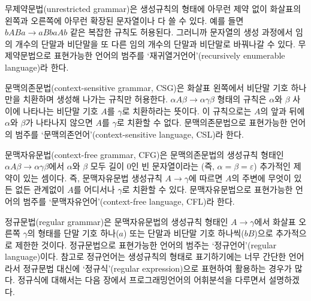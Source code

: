 %
%
%
%
%
%
%
%
무제약문법(unrestricted grammar)은 생성규칙의 형태에 아무런 제약 없이
화살표의 왼쪽과 오른쪽에 아무런 확장된 문자열이나 다 쓸 수 있다. 예를 들면
$bABa \to aBbaAb$ 같은 복잡한 규칙도 허용된다. 그러니까 문자열의 생성 과정에서
임의 개수의 단말과 비단말을 또 다른 임의 개수의 단말과 비단말로 바꿔나갈 수 있다.
무제약문법으로 표현가능한 언어의 범주를
`재귀열거언어'(recursively enumerable language)라 한다.

%
%
%
%
문맥의존문법(context-sensitive grammar, CSG)은 화살표 왼쪽에서 비단말 기호 하나만을
치환하며 생성해 나가는 규칙만 허용한다. $\alpha A\beta\to\alpha\gamma\beta$ 형태의
규칙은 $\alpha$와 $\beta$ 사이에 나타나는 비단말 기호 $A$를 $\gamma$로 치환하라는 뜻이다.
이 규칙으로는 $A$의 앞과 뒤에 $\alpha$와 $\beta$가 나타나지 않으면
$A$를 $\gamma$로 치환할 수 없다. 문맥의존문법으로 표현가능한 언어의 범주를
`문맥의존언어'(context-sensitive language, CSL)라 한다.

%
%
%
%
문맥자유문법(context-free grammar, CFG)은 문맥의존문법의 생성규칙 형태인
$\alpha A\beta\to\alpha\gamma\beta$에서 $\alpha$와 $\beta$ 모두 길이 0인
빈 문자열이라는 (즉, $\alpha=\beta=\varepsilon$) 추가적인 제약이 있는 셈이다.
즉, 문맥자유문법 생성규칙 $A\to\gamma$에 따르면 $A$의 주변에 무엇이 있든 없든
관계없이 $A$를 어디서나 $\gamma$로 치환할 수 있다. 문맥자유문법으로 표현가능한
언어의 범주를 `문맥자유언어'(context-free language, CFL)라 한다.

%
%
%
%
정규문법(regular grammar)은 문맥자유문법의 생성규칙 형태인 $A\to\gamma$에서
화살표 오른쪽 $\gamma$의 형태를 단말 기호 하나($a$) 또는
단말과 비단말 기호 하나씩($bB$)으로 추가적으로 제한한 것이다.
정규문법으로 표현가능한 언어의 범주는 `정규언어'(regular language)이다. 
참고로 정규언어는 생성규칙의 형태로 표기하기에는 너무 간단한 언어라서
정규문법 대신에 `정규식'(regular expression)으로 표현하여 활용하는 경우가 많다.
정규식에 대해서는 다음 장에서 프로그래밍언어의 어휘분석을 다루면서 설명하겠다.

